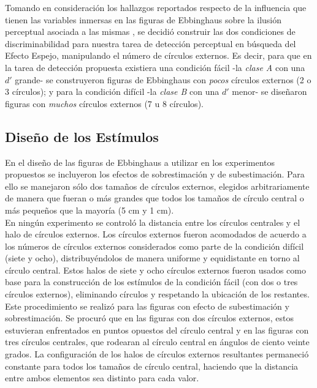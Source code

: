Tomando en consideración los hallazgos reportados respecto de la influencia que tienen las variables inmersas en las figuras de Ebbinghaus sobre la ilusión perceptual asociada a las mismas \parencite{Massaro1971}, se decidió construir las dos condiciones de discriminabilidad para nuestra tarea de detección perceptual en búsqueda del Efecto Espejo, manipulando el número de círculos externos. Es decir, para que en la tarea de detección propuesta existiera una condición fácil -la \textit{clase A} con una $d'$ grande- se construyeron figuras de Ebbinghaus con \textit{pocos} círculos externos (2 o 3 círculos); y para la condición difícil -la \textit{clase B} con una $d'$ menor- se diseñaron figuras con \textit{muchos} círculos externos (7 u 8 círculos).\\ 

\subsection{Diseño de los Estímulos}

En el diseño de las figuras de Ebbinghaus a utilizar en los experimentos propuestos se incluyeron los efectos de sobrestimación y de subestimación. Para ello se manejaron sólo dos tamaños de círculos externos, elegidos arbitrariamente de manera que fueran o más grandes que todos los tamaños de círculo central o más pequeños que la mayoría (5 cm y 1 cm).\\

En ningún experimento se controló la distancia entre los círculos centrales y el halo de círculos externos. Los círculos externos fueron acomodados de acuerdo a los números de círculos externos considerados como parte de la condición difícil (siete y ocho), distribuyéndolos de manera uniforme y equidistante en torno al círculo central. Estos halos de siete y ocho círculos externos fueron usados como base para la construcción de los estímulos de la condición fácil (con dos o tres círculos externos), eliminando círculos y respetando la ubicación de los restantes. Este procedimiento se realizó para las figuras con efecto de subestimación y sobrestimación. Se procuró que en las figuras con dos círculos externos, estos estuvieran enfrentados en puntos opuestos del círculo central y en las figuras con tres círculos centrales, que rodearan al círculo central en ángulos de ciento veinte grados. La configuración de los halos de círculos externos resultantes permaneció constante para todos los tamaños de círculo central, haciendo que la distancia entre ambos elementos sea distinto para cada valor.\\

